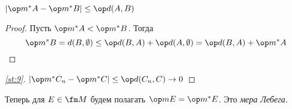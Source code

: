 \begin{statement}
	$ |\op m^* A - \op m^* B| \le \op d(A, B) $
\end{statement}

\begin{proof}
	Пусть $ \op m^* A < \op m^* B $. Тогда
	$$ \op m^* B = d(B, \O) \le \op d(B, A) + \op d(A, \O) = \op d(B, A) + \op m^* A $$
\end{proof}

\vspace{0.5em}

\begin{proof}[\autoref{st:9}]
	$ |\op m^* C_n - \op m^* C| \le \op d(C_n, C) \to 0 $
\end{proof}

Теперь для $ E \in \fm M $ будем полагать $ \op m E = \op m^* E $. Это \it{мера Лебега}.
